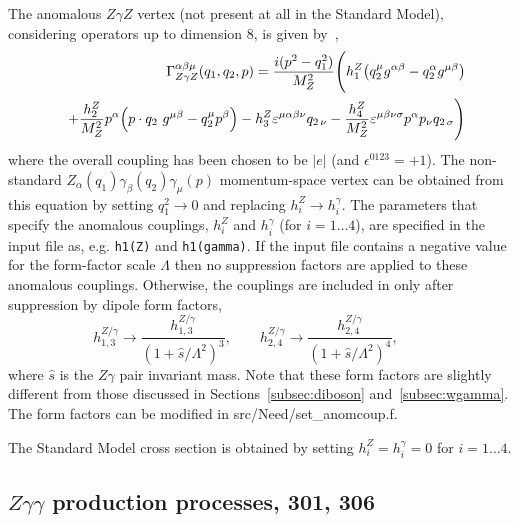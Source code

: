 The anomalous $Z\gamma Z$ vertex (not present at all in the Standard Model),
considering operators up to dimension 8, is given by~\cite{DeFlorian:2000sg},
\begin{eqnarray}
 && \Gamma^{\alpha \beta \mu}_{Z \gamma Z}(q_1, q_2, p) = 
   \frac{i(p^2-q_1^2)}{M_Z^2} \Biggl( 
   h_1^Z \bigl( q_2^\mu g^{\alpha\beta} - q_2^\alpha g^{\mu \beta}
   \bigr)
    \nonumber \\ && + \frac{h_2^Z}{M_Z^2} p^\alpha \Bigl( p\cdot q_2\ g^{\mu\beta} -
            q_2^\mu p^\beta \Bigr)
   - h_3^Z \varepsilon^{\mu\alpha\beta\nu} q_{2\, \nu} 
   - \frac{h_4^Z}{M_Z^2} \varepsilon^{\mu\beta\nu\sigma} p^\alpha
p_\nu q_{2\, \sigma} \Biggl)
\end{eqnarray}
where the overall coupling has been chosen to be $|e|$ (and
$\epsilon^{0123}=+1$). The non-standard $Z_\alpha(q_1) \gamma_\beta(q_2)
\gamma_\mu(p)$ momentum-space vertex can be obtained from
this equation by setting $q_1^2 \to 0$ and replacing $h_i^Z \to
h_i^\gamma$. 
The parameters that
specify the anomalous couplings, $h_i^Z$ and $h_i^\gamma$ (for $i=1\ldots 4$), are
specified in the input file as, e.g. {\tt h1(Z)} and {\tt h1(gamma)}.
If the input file contains a negative value for the form-factor scale $\Lambda$
then no suppression factors are applied to these anomalous couplings.
Otherwise, the couplings are included
in \MCFM{} only after suppression by dipole form factors,
\begin{displaymath}
h_{1,3}^{Z/\gamma} \rightarrow
 \frac{h_{1,3}^{Z/\gamma}}{(1+\hat{s}/\Lambda^2)^3}, \qquad
h_{2,4}^{Z/\gamma} \rightarrow
 \frac{h_{2,4}^{Z/\gamma}}{(1+\hat{s}/\Lambda^2)^4}, \qquad
\end{displaymath}
where $\hat{s}$ is the $Z\gamma$ pair invariant mass. Note that these form factors are slightly
different from those discussed in Sections~\ref{subsec:diboson} and~\ref{subsec:wgamma}. The
form factors can be modified in {\ttfamily src/Need/set\_anomcoup.f}.

The Standard Model cross section is obtained by setting $h_i^Z = h_i^\gamma = 0$ for $i=1\ldots 4$.

\subsection{$Z\gamma\gamma$ production processes, 301, 306} 

